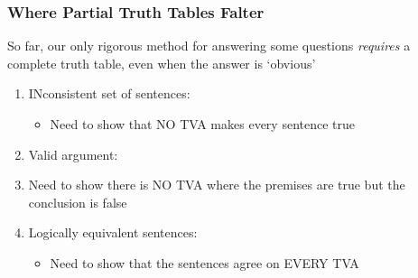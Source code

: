 \begin{frame}
\frametitle{Where Partial Truth Tables Falter}

So far, our only rigorous method for answering some questions \textit{requires} a complete truth table, even when the answer is `obvious'

\begin{enumerate}[<+->]

\item INconsistent set of sentences:

\begin{itemize}

\item Need to show that NO TVA makes every sentence true  

\end{itemize}

\item Valid argument:

\bi

\item Need to show there is NO TVA where the premises are true but the conclusion is false

\ei 

\item Logically equivalent sentences:

\begin{itemize}

\item Need to show that the sentences agree on EVERY TVA 

\end{itemize}

\end{enumerate}
\end{frame}

